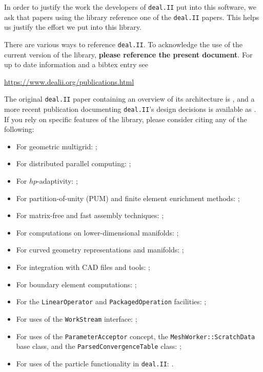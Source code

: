 \documentclass{ansarticle-preprint}
\newcommand{\specialword}[1]{\texttt{#1}}
\newcommand{\dealii}{{\specialword{deal.II}}\xspace}
\begin{document}
In order to justify the work the developers of \dealii{} put into this
software, we ask that papers using the library reference one of the
\dealii{} papers. This helps us justify the effort we put into this library.

There are various ways to reference \dealii{}. To acknowledge the use of
the current version of the library, \textbf{please reference the present
  document}. For up to date information and a bibtex entry
see
\begin{center}
  \url{https://www.dealii.org/publications.html}
\end{center}

The original \dealii{} paper containing an overview of its
architecture is \cite{BangerthHartmannKanschat2007}, and a more recent
publication documenting \dealii{}'s design decisions is available as \cite{dealII2020design}. If you rely on
specific features of the library, please consider citing any of the
following:
\begin{multicols}{2}
  \vspace*{-36pt}
  \begin{itemize}
    \item For geometric multigrid: \cite{Kanschat2004,JanssenKanschat2011,ClevengerHeisterKanschatKronbichler2019, munch2022gc};
    \item For distributed parallel computing: \cite{BangerthBursteddeHeisterKronbichler11};
    \item For $hp$-adaptivity: \cite{BangerthKayserHerold2007,fehling2022};
    \item For partition-of-unity (PUM) and finite element enrichment methods:
           \cite{Davydov2016};
    \item For matrix-free and fast assembly techniques:
          \cite{KronbichlerKormann2012,KronbichlerKormann2019};
    \item For computations on lower-dimensional manifolds:
          \cite{DeSimoneHeltaiManigrasso2009};
    \item For curved geometry representations and manifolds:
          \cite{HeltaiBangerthKronbichlerMola2019};
    \item For integration with CAD files and tools:
          \cite{HeltaiMola2015};
    \item For boundary element computations:
          \cite{GiulianiMolaHeltai-2018-a};
    \item For the \texttt{LinearOperator} and
      \texttt{Packaged\-Operation} facilities:
          \cite{MaierBardelloniHeltai-2016-a,MaierBardelloniHeltai-2016-b};
    \item For uses of the \texttt{WorkStream} interface:
          \cite{TKB16};
    \item For uses of the \texttt{ParameterAcceptor} concept, the
          \texttt{MeshWorker::ScratchData} base class, and the
          \texttt{ParsedConvergenceTable} class:
          \cite{SartoriGiulianiBardelloni-2018-a};
    \item For uses of the particle functionality in \dealii{}:
          \cite{GLHPB18}.
          \vfill\null
  \end{itemize}
\end{multicols}
\end{document}

